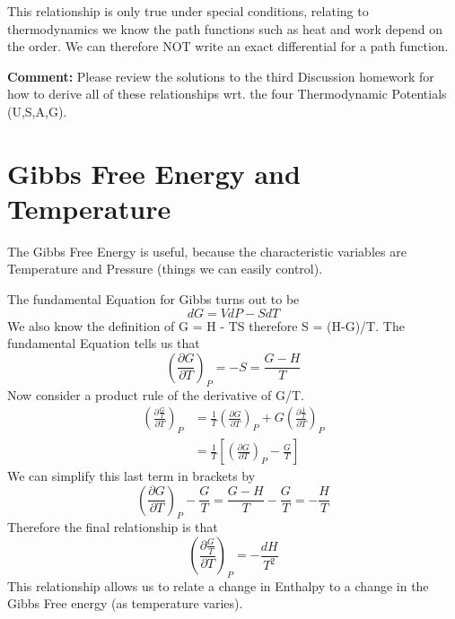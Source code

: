 \documentclass{article}
\newcommand{\be}{\begin{equation}}
\newcommand{\ee}{\end{equation}}
\newcommand{\pd}{\partial}
\begin{document}
This relationship is only true under special conditions, relating to thermodynamics we know the path functions such as heat and work depend on the order.
We can therefore NOT write an exact differential for a path function. 

\bigskip

\textbf{Comment:}
Please review the solutions to the third Discussion homework for how to derive all of these relationships wrt. the four Thermodynamic Potentials (U,S,A,G). 

\section*{Gibbs Free Energy and Temperature}
The Gibbs Free Energy is useful, because the characteristic variables are Temperature and Pressure (things we can easily control). 

The fundamental Equation for Gibbs turns out to be 
\be
dG = VdP - SdT 
\ee
We also know the definition of G = H - TS therefore S = (H-G)/T.
The fundamental Equation tells us that
\be
\left(\frac{\pd G}{\pd T}\right)_P = -S = \frac{G-H}{T}
\ee
Now consider a product rule of the derivative of G/T. 
\be
\begin{split}
\left(\frac{\pd \frac{G}{T}}{\pd T}\right)_P &= \frac{1}{T}\left(\frac{\pd G}{\pd T}\right)_P + G \left(\frac{\pd \frac{1}{T}}{\pd T}\right)_P\\
&= \frac{1}{T}\left[\left(\frac{\pd G}{\pd T}\right)_P - \frac{G}{T}\right]
\end{split}
\ee
We can simplify this last term in brackets by
\be
\left(\frac{\pd G}{\pd T}\right)_P - \frac{G}{T}= \frac{G-H}{T} - \frac{G}{T} = -\frac{H}{T}
\ee
Therefore the final relationship is that
\be
\left(\frac{\pd \frac{G}{T}}{\pd T}\right)_P = -\frac{dH}{T^2}
\ee
This relationship allows us to relate a change in Enthalpy to a change in the Gibbs Free energy (as temperature varies). 
\end{document}
